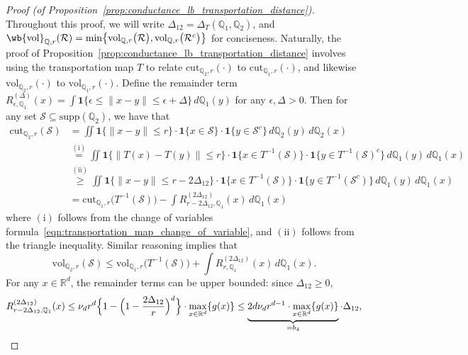 \documentclass{article}
\newcommand{\Reals}{\mathbb{R}}
\newcommand{\vol}{\mathrm{vol}}
\newcommand{\cut}{\mathrm{cut}}
\newcommand{\1}{\mathbf{1}}
\newcommand{\Rd}{\Reals^d}
\newcommand{\mc}[1]{\mathcal{#1}}
\newcommand{\mbb}[1]{\mathbb{#1}}
\theoremstyle{definition}
\theoremstyle{remark}
\begin{document}
\begin{proof}[Proof (of Proposition~\ref{prop:conductance_lb_transportation_distance})]
	Throughout this proof, we will write $\Delta_{12} = \Delta_T(\mbb{Q}_1,\mbb{Q}_2)$, and $\wb{\vol}_{\mbb{Q},r}(\mc{R}) = \min\bigl\{\vol_{\mbb{Q},r}\bigl(\mc{R}\bigr),\vol_{\mbb{Q},r}\bigl(\mc{R}^c\bigr)\bigr\}$ for conciseness. Naturally, the proof of Proposition~\ref{prop:conductance_lb_transportation_distance} involves using the transportation map $T$ to relate $\cut_{\mbb{Q}_2,r}(\cdot)$ to $\cut_{\mbb{Q}_1,r}(\cdot)$, and likewise $\vol_{\mbb{Q}_2,r}(\cdot)$ to $\vol_{\mbb{Q}_1,r}(\cdot)$. Define the remainder term $R_{\epsilon,\mbb{Q}_1}^{(\Delta)}(x) = \int \1\{\epsilon \leq \|x - y\| \leq \epsilon + \Delta\} \,d\mbb{Q}_1(y)$ for any $\epsilon, \Delta > 0$. Then for any set $\mc{S} \subseteq \mathrm{supp}(\mbb{Q}_2)$, we have that
	\begin{align}
	\cut_{\mbb{Q}_2,r}(\mc{S}) & = \iint \1\{\|x - y\|\leq r\} \cdot \1\{x \in \mc{S} \} \cdot \1\{y \in \mc{S}^c \} \,d\mbb{Q}_2(y) \,d\mbb{Q}_2(x) \nonumber \\ 
	& \overset{\mathrm{(i)}}{=} \iint \1\{\|T(x) - T(y)\|\leq r\} \cdot \1\{x \in T^{-1}(\mc{S}) \} \cdot \1\{y \in T^{-1}(\mc{S})^c \} \,d\mbb{Q}_1(y) \,d\mbb{Q}_1(x) \nonumber \\
	& \overset{\mathrm{(ii)}}{\geq} \iint \1\{\|x - y\|\leq r - 2\Delta_{12}\} \cdot \1\{x \in T^{-1}(\mc{S}) \} \cdot \1\{y \in T^{-1}(\mc{S}^c) \} \,d\mbb{Q}_1(y) \,d\mbb{Q}_1(x) \nonumber \\
	& = \cut_{\mbb{Q}_1,r}\bigl(T^{-1}(\mc{S})\bigr) - \int R_{r - 2\Delta_{12} ,\mbb{Q}_1}^{(2\Delta_{12})}(x) \,d\mbb{Q}_1(x) \label{pf:conductance_lb_transportation_distance_1}
	\end{align} 
	where $\mathrm{(i)}$ follows from the change of variables formula~\eqref{eqn:transportation_map_change_of_variable}, and $\mathrm{(ii)}$ follows from the triangle inequality. Similar reasoning implies that
	\begin{equation}
	\label{pf:conductance_lb_transportation_distance_2}
	\vol_{\mbb{Q}_2,r}(\mc{S}) \leq \vol_{\mbb{Q}_1,r}\bigl(T^{-1}(\mc{S})\bigr) + \int R_{r,\mbb{Q}_1}^{(2\Delta_{12})}(x)  \,d\mbb{Q}_1(x).
	\end{equation}
	For any $x \in \Rd$, the remainder terms can be upper bounded: since $\Delta_{12} \geq 0$,
	\begin{equation*}
	R_{r - 2\Delta_{12} ,\mbb{Q}_1}^{(2\Delta_{12})}(x) \leq \nu_dr^d\Bigl\{1 - \Bigl(1 - \frac{2\Delta_{12}}{r}\Bigr)^d \Bigr\} \cdot \max_{x \in \Rd}\{g(x)\} \leq \underbrace{2 d \nu_d r^{d - 1} \cdot \max_{x \in \Rd}\{g(x)\}}_{= b_4} \cdot \Delta_{12},

\end{equation*}
\end{proof}
\end{document}

